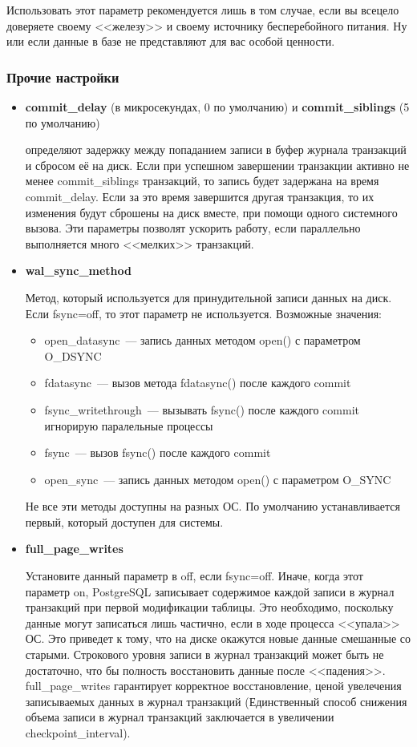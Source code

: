 Использовать этот параметр рекомендуется лишь в том случае, если вы всецело доверяете своему <<железу>> и своему источнику 
бесперебойного питания. Ну или если данные в базе не представляют для вас особой ценности.

\subsubsection{Прочие настройки}
\begin{itemize}
\item 
\textbf{commit\_delay} (в микросекундах, 0 по умолчанию) и \textbf{commit\_sib\-lings} (5 по умолчанию) 

определяют задержку между попаданием записи в буфер журнала транзакций и сбросом её на диск. 
Если при успешном завершении транзакции активно не менее commit\_siblings транзакций, то запись будет задержана на время 
commit\_delay. Если за это время завершится другая транзакция, то их изменения будут сброшены на диск вместе, при помощи 
одного системного вызова. Эти параметры позволят ускорить работу, если параллельно выполняется много <<мелких>> транзакций.

\item \textbf{wal\_sync\_method}

Метод, который используется для принудительной записи данных на диск.
Если fsync=off, то этот параметр не используется.
Возможные значения:
\begin{itemize}
\item open\_datasync~--- запись данных методом open() с параметром O\_DSYNC
\item fdatasync~--- вызов метода fdatasync() после каждого commit
\item fsync\_writethrough~--- вызывать fsync() после каждого commit игнорирую паралельные процессы
\item fsync~--- вызов fsync() после каждого commit
\item open\_sync~--- запись данных методом open() с параметром O\_SYNC
\end{itemize}

Не все эти методы доступны на разных ОС. По умолчанию устанавливается первый, который доступен для системы.

\item \textbf{full\_page\_writes}

Установите данный параметр в off, если fsync=off. Иначе, когда этот параметр on, PostgreSQL записывает содержимое 
каждой записи в журнал транзакций при первой модификации таблицы. Это необходимо, поскольку 
данные могут записаться лишь частично, если в ходе процесса <<упала>> ОС. Это приведет к тому, что на диске окажутся 
новые данные смешанные со старыми. Строкового уровня записи в журнал транзакций может быть не достаточно, что бы полность 
восстановить данные после <<падения>>. full\_page\_writes гарантирует корректное восстановление, ценой увелечения записываемых 
данных в журнал транзакций (Единственный способ снижения объема записи в журнал транзакций заключается в 
увеличении checkpoint\_interval).


\end{itemize}
